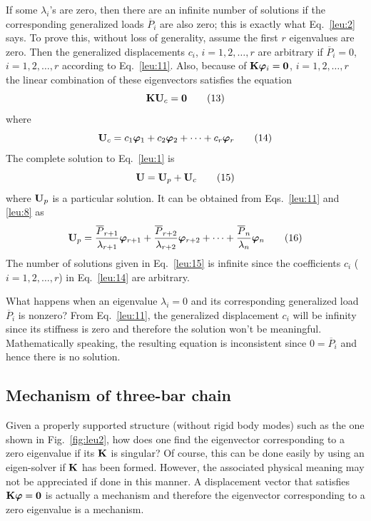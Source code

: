 If some $\lambda_i$'s are zero, then there are an infinite number of solutions if the corresponding generalized loads $\overline{P}_i$ are also zero; this is exactly what Eq.~\eqref{leu:2} says. To prove this, without loss of generality, assume the first $r$ eigenvalues are zero. Then the generalized displacements $c_i$, $i = 1,2,\dots,r$ are arbitrary if $\overline{P}_i = 0$, $i = 1,2,\dots,r$ according to Eq.~\eqref{leu:11}. Also, because of $\mathbf{K}\bm{\varphi}_i = \mathbf{0}$, $i = 1,2,\dots,r$ the linear combination of these eigenvectors satisfies the equation
\begin{equation}
  \mathbf{K}\mathbf{U}_c = \mathbf{0} \tag{13}
\end{equation}
where
\begin{equation}
  \mathbf{U}_c = c_1\bm{\varphi}_1 + c_2\bm{\varphi}_2 + \dots + c_r\bm{\varphi}_r \tag{14}\label{leu:14}
\end{equation}
The complete solution to Eq.~\eqref{leu:1} is
\begin{equation}
  \mathbf{U} = \mathbf{U}_p + \mathbf{U}_c \tag{15}\label{leu:15}
\end{equation}
where $\mathbf{U}_p$ is a particular solution. It can be obtained from Eqs.~\eqref{leu:11} and \eqref{leu:8} as
\begin{equation}
  \mathbf{U}_p = \frac{\overline{P}_{r+1}}{\lambda_{r+1}}\bm{\varphi}_{r+1} + \frac{\overline{P}_{r+2}}{\lambda_{r+2}}\bm{\varphi}_{r+2} + \dots + \frac{\overline{P}_n}{\lambda_n}\bm{\varphi}_n \tag{16}
\end{equation}
The number of solutions given in Eq.~\eqref{leu:15} is infinite since the coefficients $c_i$ ($i = 1,2,\dots,r$) in Eq.~\eqref{leu:14} are arbitrary.

What happens when an eigenvalue $\lambda_i = 0$ and its corresponding generalized load $\overline{P}_i$ is nonzero? From Eq.~\eqref{leu:11}, the generalized displacement $c_i$ will be infinity since its stiffness is zero and therefore the solution won't be meaningful. Mathematically speaking, the resulting equation is inconsistent since $0 = \overline{P}_i$ and hence there is no solution.

\subsection*{Mechanism of three-bar chain}
Given a properly supported structure (without rigid body modes) such as the one shown in Fig.~\ref{fig:leu2}, how does one find the eigenvector corresponding to a zero eigenvalue if its $\mathbf{K}$ is singular? Of course, this can be done easily by using an eigen-solver if $\mathbf{K}$ has been formed. However, the associated physical meaning may not be appreciated if done in this manner. A displacement vector that satisfies $\mathbf{K}\bm{\varphi} = \mathbf{0}$ is actually a mechanism and therefore the eigenvector corresponding to a zero eigenvalue is a mechanism.

